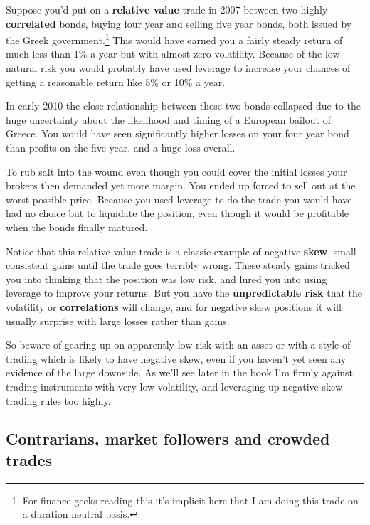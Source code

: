 Suppose you'd put on a \textbf{relative value} trade in 2007 between two highly \textbf{correlated} bonds, buying four year and selling five year bonds, both issued by the Greek government.\footnote{For finance geeks reading this it's implicit here that I am doing this trade on a duration neutral basis.} This would have earned you a fairly steady return of much less than 1\% a year but with almost zero volatility. Because of the low natural risk you would probably have used leverage to increase your chances of getting a reasonable return like 5\% or 10\% a year.

In early 2010 the close relationship between these two bonds collapsed due to the huge uncertainty about the likelihood and timing of a European bailout of Greece. You would have seen significantly higher losses on your four year bond than profits on the five year, and a huge loss overall.

To rub salt into the wound even though you could cover the initial losses your brokers then demanded yet more margin. You ended up forced to sell out at the worst possible price. Because you used leverage to do the trade you would have had no choice but to liquidate the position, even though it would be profitable when the bonds finally matured.

Notice that this relative value trade is a classic example of negative \textbf{skew}, small consistent gains until the trade goes terribly wrong. These steady gains tricked you into thinking that the position was low risk, and lured you into using leverage to improve your returns. But you have the \textbf{unpredictable risk} that the volatility or \textbf{correlations} will change, and for negative skew positions it will usually surprise with large losses rather than gains.

So beware of gearing up on apparently low risk with an asset or with a style of trading which is likely to have negative skew, even if you haven't yet seen any evidence of the large downside. As we'll see later in the book I'm firmly against trading instruments with very low volatility, and leveraging up negative skew trading rules too highly.

\subsection*{Contrarians, market followers and crowded trades}

